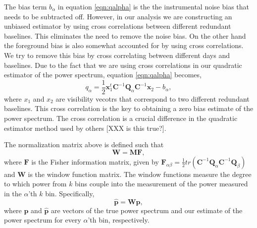 \documentclass[twocolumn,numberedappendix]{emulateapj} \shorttitle{PSA64}
\newcommand{\x}{\mathbf{x}} \newcommand{\xhat}{\hat{\mathbf{x}}}
\begin{document}
The bias term $b_{\alpha}$ in equation \ref{eqn:qalpha} is the the instrumental
noise bias that needs to be subtracted off. However, in our analysis we are
constructing an unbiased estimator by using cross correlations between different
redundant baselines. This eliminates the need to remove the noise bias. On the
other hand the foreground bias is also somewhat accounted for by using cross
correlations. We try to remove this bias by cross correlating between different
days and baselines. Due to the fact that we are using cross correlations in our
quadratic estimator of the power spectrum, equation \ref{eqn:qalpha} becomes, 
\begin{equation}\label{eqn:qalpha_unbiased}
    q_{\alpha} =
\frac{1}{2}\x_{1}^{t}\mathbf{C}^{-1}\mathbf{Q}_{\alpha}\mathbf{C}^{-1}\x_{2} - b_{\alpha},
\end{equation}
where $x_{1}$ and $x_{2}$ are visibility vecotrs that correspond to two
different redundant baselines. This cross correlation is the key to obtaining a
zero bias estimate of the power spectrum. The cross correlation is a crucial
difference in the quadratic estimator method used by others [XXX is this
true?].

The normalization matrix above is defined such that
\begin{equation}
    \mathbf{W} = \mathbf{M}\mathbf{F}, 
\end{equation}
where $\mathbf{F}$ is the Fisher information matrix, given by
$\mathbf{F}_{\alpha\beta} =
\frac{1}{2}tr(\mathbf{C}^{-1}\mathbf{Q}_{\alpha}\mathbf{C}^{-1}\mathbf{Q}_{\beta})$
and $\mathbf{W}$ is the window function matrix. The window functions measure the
degree to which power from $k$ bins couple into the measurement of the power
measured in the $\alpha$'th $k$ bin. Specifically, 
\begin{equation}
    \hat{\mathbf{p}} = \mathbf{W}\mathbf{p}, 
\end{equation}
where $\mathbf{p}$ and $\hat{\mathbf{p}}$ are vectors of the true power spectrum and our
estimate of the power spectrum for every $\alpha$'th bin, respectively.
\end{document}
